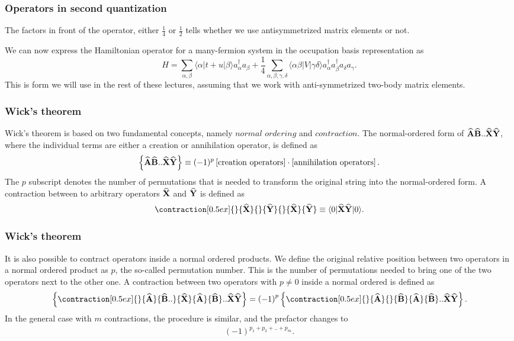 \documentclass[compress]{beamer}
\newcommand*{\for}[3]{\langle#1|#2|#3\rangle}
\newcommand*{\kpr}[1]{\left\{#1\right\}}
\newcommand*{\ket}[1]{|#1\rangle}
\newcommand*{\bra}[1]{\langle#1|}
\newcommand{\OP}[1]{{\bf\widehat{#1}}}
\newcommand*{\fpr}[1]{\left[#1\right]}
\newcommand*{\pr}[1]{\left(#1\right)}
\newcommand{\element}[3]
        {\bra{#1}#2\ket{#3}}
\begin{document}
\frame
{
  \frametitle{Operators in second quantization}
\begin{small}
{\scriptsize
The factors in front of the operator, either  $\frac{1}{4}$ or 
$\frac{1}{2}$ tells whether we use antisymmetrized matrix elements or not. 

We can now express the Hamiltonian operator for a many-fermion system  in the occupation basis representation
as  
\begin{equation}
	H = \sum_{\alpha, \beta} \element{\alpha}{t+u}{\beta} a_\alpha^\dagger a_\beta + \frac{1}{4} \sum_{\alpha, \beta, \gamma, \delta}
		\element{\alpha \beta}{V}{\gamma \delta} a_\alpha^\dagger a_\beta^\dagger a_\delta a_\gamma. \label{eq:2-46b}
\end{equation}
This is form we will use in the rest of these lectures, assuming that we work with anti-symmetrized two-body matrix elements.
}
\end{small}
}




\frame
{
  \frametitle{Wick's theorem}
\begin{small}
{\scriptsize
Wick's theorem is based on two fundamental concepts, namely $\textit{normal ordering}$ and $\textit{contraction}$. The normal-ordered form of $\OP{A}\OP{B}..\OP{X}\OP{Y}$, where the individual terms are either a creation or annihilation operator, is defined as
\begin{align}
\label{def: Normal ordering}
\kpr{\OP{A}\OP{B}..\OP{X}\OP{Y}} \equiv (-1)^p\fpr{\text{creation operators}}\cdot\fpr{\text{annihilation operators}}.
\end{align}
The $p$ subscript denotes the number of permutations that is needed to transform the original string into the normal-ordered form. A contraction between to arbitrary operators $\OP{X}$ and $\OP{Y}$ is defined as  
\begin{align}
\contraction[0.5ex]{}{\OP{X}}{}{\OP{Y}}{} 
\OP{X}\OP{Y}  \equiv \for{0}{\OP{X}\OP{Y}}{0}.
\end{align}
}
\end{small}
}

\frame
{
  \frametitle{Wick's theorem}
\begin{small}
{\scriptsize
It is also possible to contract operators inside a normal ordered products. We define the  original relative position between two operators in a normal ordered product as $p$, the so-called permutation number. This is the number of permutations needed to bring one of the two operators next to the other one. A contraction between two operators with $p \neq 0$ inside a normal ordered is defined as
\begin{align}
\kpr{\contraction[0.5ex]{}{\OP{A}}{\OP{B}..}{\OP{X}}\OP{A}\OP{B}..\OP{X}\OP{Y}} = \pr{-1}^p \kpr{\contraction[0.5ex]{}{\OP{A}}{}{\OP{B}}\OP{A}\OP{B}..\OP{X}\OP{Y}}.
\end{align}
In the general case with $m$ contractions, the procedure is similar, and the prefactor changes to 
\begin{align}
\pr{-1}^{p_1 + p_2 + .. + p_m}.
\end{align} 
}
\end{small}
}
\end{document}
